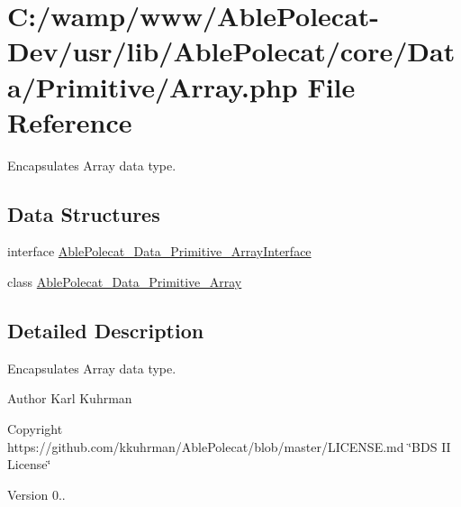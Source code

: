 \hypertarget{_array_8php}{}\section{C\+:/wamp/www/\+Able\+Polecat-\/\+Dev/usr/lib/\+Able\+Polecat/core/\+Data/\+Primitive/\+Array.php File Reference}
\label{_array_8php}


Encapsulates Array data type.  


\subsection*{Data Structures}
\begin{DoxyCompactItemize}
\item 
interface \hyperlink{interface_able_polecat___data___primitive___array_interface}{Able\+Polecat\+\_\+\+Data\+\_\+\+Primitive\+\_\+\+Array\+Interface}
\item 
class \hyperlink{class_able_polecat___data___primitive___array}{Able\+Polecat\+\_\+\+Data\+\_\+\+Primitive\+\_\+\+Array}
\end{DoxyCompactItemize}


\subsection{Detailed Description}
Encapsulates Array data type. 

\begin{DoxyAuthor}{Author}
Karl Kuhrman 
\end{DoxyAuthor}
\begin{DoxyCopyright}{Copyright}
https\+://github.com/kkuhrman/\+Able\+Polecat/blob/master/\+L\+I\+C\+E\+N\+S\+E.\+md \char`\"{}\+B\+D\+S I\+I License\char`\"{} 
\end{DoxyCopyright}
\begin{DoxyVersion}{Version}
0.. 
\end{DoxyVersion}
